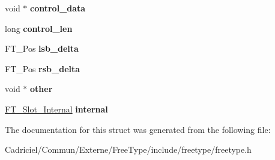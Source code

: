 \begin{DoxyCompactItemize}
\item 
void $\ast$ {\bfseries control\+\_\+data}\hypertarget{struct_f_t___glyph_slot_rec___a2af67814d985bcdfcffdf7e8a36ebbdf}{}\label{struct_f_t___glyph_slot_rec___a2af67814d985bcdfcffdf7e8a36ebbdf}

\item 
long {\bfseries control\+\_\+len}\hypertarget{struct_f_t___glyph_slot_rec___a7a088255cb09abe42f19f650f48b6b3f}{}\label{struct_f_t___glyph_slot_rec___a7a088255cb09abe42f19f650f48b6b3f}

\item 
F\+T\+\_\+\+Pos {\bfseries lsb\+\_\+delta}\hypertarget{struct_f_t___glyph_slot_rec___a7d0d8c2eda28e38541e953186ecab89a}{}\label{struct_f_t___glyph_slot_rec___a7d0d8c2eda28e38541e953186ecab89a}

\item 
F\+T\+\_\+\+Pos {\bfseries rsb\+\_\+delta}\hypertarget{struct_f_t___glyph_slot_rec___a2ca5f5e7b92df3aee4584949fa6a2a1c}{}\label{struct_f_t___glyph_slot_rec___a2ca5f5e7b92df3aee4584949fa6a2a1c}

\item 
void $\ast$ {\bfseries other}\hypertarget{struct_f_t___glyph_slot_rec___ad0c5ab51842f178ba571bab2874f1bdb}{}\label{struct_f_t___glyph_slot_rec___ad0c5ab51842f178ba571bab2874f1bdb}

\item 
\hyperlink{struct_f_t___slot___internal_rec__}{F\+T\+\_\+\+Slot\+\_\+\+Internal} {\bfseries internal}\hypertarget{struct_f_t___glyph_slot_rec___a91731fd527eeab1d1acf3e1aea4bea84}{}\label{struct_f_t___glyph_slot_rec___a91731fd527eeab1d1acf3e1aea4bea84}

\end{DoxyCompactItemize}


The documentation for this struct was generated from the following file\+:\begin{DoxyCompactItemize}
\item 
Cadriciel/\+Commun/\+Externe/\+Free\+Type/include/freetype/freetype.\+h\end{DoxyCompactItemize}
